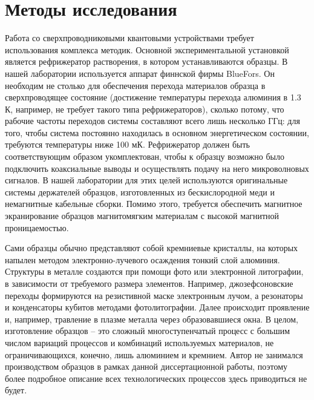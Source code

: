 \documentclass[14pt, a4paper]{extreport}
\numberwithin{equation}{section}
\begin{document}
\section*{Методы исследования}

Работа со сверхпроводниковыми квантовыми устройствами требует использования комплекса методик. Основной экспериментальной установкой является рефрижератор растворения, в котором устанавливаются образцы. В нашей лаборатории используется аппарат финнской фирмы BlueFors. Он необходим не столько для обеспечения перехода материалов образца в сверхпроводящее состояние (достижение температуры перехода алюминия в 1.3 К, например, не требует такого типа рефрижераторов), сколько потому, что рабочие частоты переходов системы составляют всего лишь несколько ГГц: для того, чтобы система постоянно находилась в  основном энергетическом состоянии, требуются температуры ниже 100 мК. Рефрижератор должен быть соответствующим образом укомплектован, чтобы к образцу возможно было подключить коаксиальные выводы и осуществлять подачу на него микроволновых сигналов. В нашей лаборатории для этих целей используются оригинальные системы держателей образцов, изготовленных из бескислородной меди и немагнитные кабельные сборки. Помимо этого, требуется обеспечить магнитное экранирование образцов магнитомягким материалам с высокой магнитной проницаемостью.

Сами образцы обычно представляют собой кремниевые кристаллы, на которых напылен методом электронно-лучевого осаждения тонкий слой алюминия. Структуры в металле создаются при помощи фото или электронной литографии, в зависимости от требуемого размера элементов. Например, джозефсоновские переходы формируются на резистивной маске электронным лучом, а резонаторы и конденсаторы кубитов методами фотолитографии. Далее происходит проявление и, например, травление в плазме металла через образовавшиеся окна. В целом, изготовление образцов -- это сложный многоступенчатый процесс с большим числом вариаций процессов и комбинаций используемых материалов, не ограничивающихся, конечно, лишь алюминием и кремнием. Автор не занимался производством образцов в рамках данной диссертационной работы, поэтому более подробное описание всех технологических процессов здесь приводиться не будет.
\end{document}
